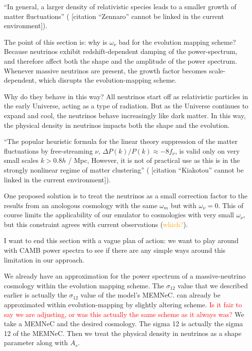 \documentclass[11pt]{article}
\newcommand{\cbib}[1]
{\IfFileExists{biblatex.sty}
{\cite{#1}}
{[citation ``#1'' cannot be linked in the current environment]}}
\begin{document}
``In general, a larger density of relativistic species leads to a smaller
growth of matter fluctuations'' (\cbib{Zennaro}).


The point of this section is: why is $\omega_\nu$ bad for the
evolution mapping scheme? Because neutrinos exhibit redshift-dependent
damping of the power-spectrum, and therefore affect both the shape and the
amplitude of the power spectrum. Whenever massive neutrinos are present,
the growth factor becomes scale-dependent, which disrupts the
evolution-mapping scheme.

Why do they behave in this way? All neutrinos start off as
relativistic particles in the early Universe, acting as a type of radiation.
But as the Universe continues to expand and cool, the neutrinos behave
increasingly like dark matter.
In this way, the physical density in neutrinos impacts both the shape and the
evolution.

``The popular heuristic formula for the linear theory suppression of the matter
fluctuations by free-streaming $\nu$, $\Delta P(k) / P(k) \approx -8 f_\nu$, is
valid only on very small scales $k > 0.8 h$ / Mpc, However, it is not of
practical use as this is in the strongly nonlinear regime of matter
clustering'' (\cbib{Kiakotou}).

One proposed solution is to treat the neutrinos as a small correction factor
to the results from an anologous cosmology with the same $\omega_m$ but with
$\omega_\nu = 0$. This of course limits the applicability of our emulator to
cosmologies with very small $\omega_\nu$, but this constraint agrees with
current observations (\textcolor{orange}{which?}).

I want to end this section with a vague plan of action: we want to play around with CAMB power spectra to see if there are any simple ways around this limitation in our approach.


We already have an approximation for the power spectrum of a massive-neutrino cosmology within the evolution mapping scheme. The $\sigma_{12}$ value that we described earlier is actually the $\sigma_{12}$ value of the model's MEMNeC. can already be approximated within evolution-mapping by slightly altering scheme. \textcolor{red}{Is it fair to say we are adjusting, or was this actually the same scheme as it always was?} We take a MEMNeC and the desired cosmology. The sigma 12 is actually the sigma 12 of the MEMNeC. Then we treat the physical density in neutrinos as a shape parameter along with $A_s$.
\end{document}
